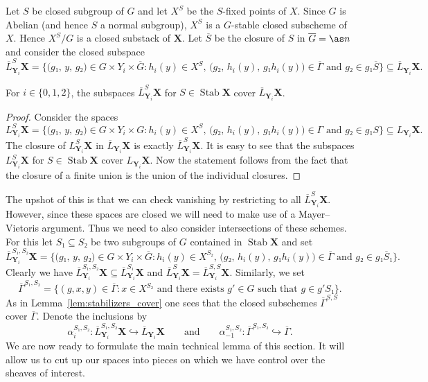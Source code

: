 \documentclass[english]{ck-article}
\let\stack\mathbf
\let\bar\overline
\newcommand\slsY[2][\stack Y]{L_{#1}#2}
\newcommand\sclsY[2][\stack Y]{\overline{L}_{#1}#2}
\newcommand\stablsY[3][\stack Y]{L_{#1}^{#2}#3}
\newcommand\stabclsY[3][\stack Y]{\overline{L}_{#1}^{#2}#3}
\newcommand\Stab{\operatorname{Stab}}
\begin{document}
Let $S$ be closed subgroup of $G$ and let $X^S$ be the $S$-fixed points of $X$.
Since $G$ is Abelian (and hence $S$ a normal subgroup), $X^S$ is a $G$-stable closed subscheme of $X$.
Hence $X^S/G$ is a closed substack of $\stack X$.
Let $\bar S$ be the closure of $S$ in $\bar G = \as n$ and consider the closed subspace
\[
    \stabclsY[\stack Y_i]{S}{\stack X} =
    \biggl\{
        \bigl(g₁,\, y,\, g₂\bigr) ∈ G × Y_i × \bar G : h_i(y) ∈ X^S,\, \bigl(g₂,\, h_i(y),\, g₁h_i(y)\bigr) ∈ \bar Γ \text{ and } g₂ ∈ g₁\bar S
    \biggr\}
    ⊆
    \sclsY[\stack Y_i] \stack X.
\]

\begin{Lem}
    \label{lem:stabilizers_cover}%
    For $i \in \{0,1,2\}$, the subspaces $\stabclsY[\stack Y_i]{S}{\stack X}$ for $S ∈ \Stab\stack X$ cover $\sclsY[\stack Y_i]{\stack X}$.
\end{Lem}

\begin{proof}
    Consider the spaces
    \[
        \stablsY[\stack Y_i]{S}{\stack X} =
        \biggl\{
            \bigl(g₁,\, y,\, g₂\bigr) ∈ G × Y_i × G : h_i(y) ∈ X^S,\, \bigl(g₂,\, h_i(y),\, g₁h_i(y)\bigr) ∈ Γ \text{ and } g₂ ∈ g₁S
        \biggr\}
        \subseteq \slsY[\stack Y_i] \stack X.
    \]
    The closure of $\stablsY[\stack Y_i]{S}{\stack X}$ in $\sclsY[\stack Y_i] \stack X$ is exactly $\stabclsY[\stack Y_i]{S}{\stack X}$.
    It is easy to see that the subspaces $\stablsY[\stack Y_i]{S}{\stack X}$ for $S ∈ \Stab \stack X$ cover $\slsY[\stack Y_i] \stack X$.
    Now the statement follows from the fact that the closure of a finite union is the union of the individual closures.
\end{proof}

The upshot of this is that we can check vanishing by restricting to all $\stabclsY[\stack Y_i]{S}{\stack X}$.
However, since these spaces are closed we will need to make use of a Mayer--Vietoris argument.
Thus we need to also consider intersections of these schemes.
For this let $S₁ \subseteq S₂$ be two subgroups of $G$ contained in $\Stab\stack X$ and set
\[
    \stabclsY[\stack Y_i]{S₁,S₂} \stack X =
    \biggl\{
        \bigl(g₁,\, y,\, g₂\bigr) ∈ G × Y_i × \bar G : h_i(y) ∈ X^{S₂},\, \bigl(g₂,\, h_i(y),\, g₁h_i(y)\bigr) ∈ \bar Γ \text{ and } g₂ ∈ g₁\bar S₁
    \biggr\}.
\]
Clearly we have $\stabclsY[\stack Y_i]{S₁,S₂}{\stack X} \subseteq \stabclsY[\stack Y_i]{S₁}{\stack X}$ and $\stabclsY[\stack Y_i]{S}{\stack X} = \stabclsY[\stack Y_i]{S,S}{\stack X}$.
Similarly, we set
\[
    \bar Γ^{S₁,S₂} = \bigl\{ (g,x,y) ∈ \bar Γ : x ∈ X^{S₂} \text{ and there exists $g' ∈ G$ such that $g ∈ g'S₁$}  \bigr\}.
\]
As in Lemma~\ref{lem:stabilizers_cover} one sees that the closed subschemes $\bar Γ^{S,S}$ cover $\bar Γ$.
Denote the inclusions by
\[
    α_i^{S₁,S₂}\colon \stabclsY[\stack Y_i]{S₁,S₂}{\stack X} \hookrightarrow \sclsY[\stack Y_i]{\stack X}
    \qquad\text{and}\qquad
    α_{-1}^{S₁,S₂}\colon \bar Γ^{S₁,S₂} \hookrightarrow \bar Γ.
\]
We are now ready to formulate the main technical lemma of this section.
It will allow us to cut up our spaces into pieces on which we have control over the sheaves of interest.
\end{document}
